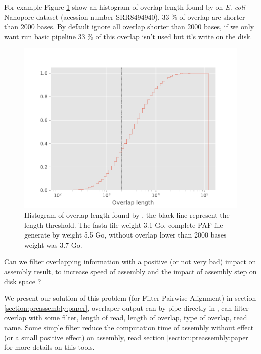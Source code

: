 \documentclass[main.tex]{subfiles}
\begin{document}
For example Figure \ref{intro:fig:length_overlap_histogram} show an histogram of overlap length found by \minimap on \textit{E. coli} Nanopore dataset (acession number SRR8494940), 33 \% of overlap are shorter than 2000 bases. By default \miniasm ignore all overlap shorter than 2000 bases, if we only want run basic \miniasm pipeline 33 \% of this overlap isn't used but it's write on the disk.

\begin{figure}
    \centering
    \includegraphics[width=\textwidth]{introduction/images/overlap_length.pdf}
    \caption{Histogram of overlap length found by \minimap, the black line represent the \miniasm length threshold. The fasta file weight 3.1 Go, complete PAF file generate by \minimap weight 5.5 Go, without overlap lower than 2000 bases weight was 3.7 Go.}
    \label{intro:fig:length_overlap_histogram}
\end{figure}

Can we filter overlapping information with a positive (or not very bad) impact on assembly result, to increase speed of assembly and the impact of assembly step on disk space ?

We present our solution of this problem \fpa (for Filter Pairwise Alignment) in section \ref{section:preassembly:paper}, overlaper output can by pipe directly in \fpa , \fpa can filter overlap with some filter, length of read, length of overlap, type of overlap, read name. Some simple \fpa filter reduce the computation time of assembly without effect (or a small positive effect) on assembly, read section \ref{section:preassembly:paper} for more details on this tools.
\end{document}
